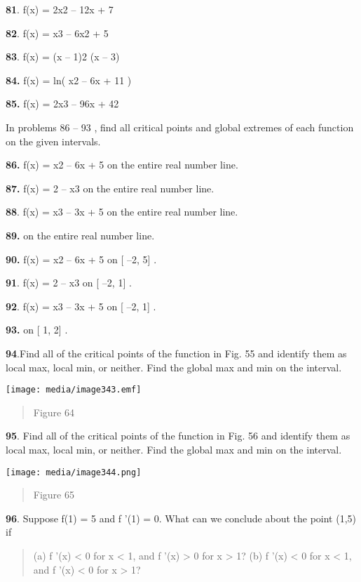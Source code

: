\textbf{81}. f(x) = 2x2 -- 12x + 7

\textbf{82}. f(x) = x3 -- 6x2 + 5

\textbf{83}. f(x) = (x -- 1)2 (x -- 3)

\textbf{84.} f(x) = ln( x2 -- 6x + 11 )

\textbf{85.} f(x) = 2x3 -- 96x + 42

In problems 86 -- 93 , find all critical points and global extremes of
each function on the given intervals.

\textbf{86.} f(x) = x2 -- 6x + 5 on the entire real number line.

\textbf{87.} f(x) = 2 -- x3 on the entire real number line.

\textbf{88}. f(x) = x3 -- 3x + 5 on the entire real number line.

\textbf{89.} on the entire real number line.

\textbf{90.} f(x) = x2 -- 6x + 5 on {[} --2, 5{]} .

\textbf{91}. f(x) = 2 -- x3 on {[} --2, 1{]} .

\textbf{92}. f(x) = x3 -- 3x + 5 on {[} --2, 1{]} .

\textbf{93.} on {[} 1, 2{]} .

\textbf{94}.Find all of the critical points of the function in Fig. 55
and identify them as local max, local min, or neither. Find the global
max and min on the interval.

\texttt{[image: media/image343.emf]}

\begin{quote}
Figure 64
\end{quote}

\textbf{95}. Find all of the critical points of the function in Fig. 56
and identify them as local max, local min, or neither. Find the global
max and min on the interval.

\texttt{[image: media/image344.png]}

\begin{quote}
Figure 65
\end{quote}

\textbf{96}. Suppose f(1) = 5 and f '(1) = 0. What can we conclude about
the point (1,5) if

\begin{quote}
(a) f '(x) \textless{} 0 for x \textless{} 1, and f '(x) \textgreater{}
0 for x \textgreater{} 1? (b) f '(x) \textless{} 0 for x \textless{} 1,
and f '(x) \textless{} 0 for x \textgreater{} 1?
\end{quote}

